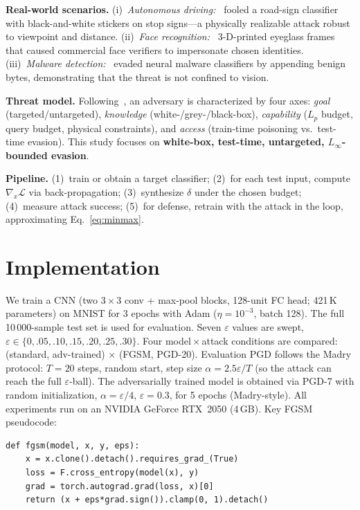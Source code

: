 \documentclass[10pt, twocolumn]{article}
\begin{document}
\textbf{Real-world scenarios.} (i)~\emph{Autonomous driving:}~\citet{eykholt2018robust} fooled a road-sign classifier with black-and-white stickers on stop signs---a physically realizable attack robust to viewpoint and distance. (ii)~\emph{Face recognition:}~\citet{sharif2016accessorize} 3-D-printed eyeglass frames that caused commercial face verifiers to impersonate chosen identities. (iii)~\emph{Malware detection:}~\citet{grosse2017adversarial} evaded neural malware classifiers by appending benign bytes, demonstrating that the threat is not confined to vision.

\textbf{Threat model.} Following~\citet{nist2021aml}, an adversary is characterized by four axes: \emph{goal} (targeted/untargeted), \emph{knowledge} (white-/grey-/black-box), \emph{capability} ($L_p$ budget, query budget, physical constraints), and \emph{access} (train-time poisoning vs.\ test-time evasion). This study focuses on \textbf{white-box, test-time, untargeted, $L_\infty$-bounded evasion}.

\textbf{Pipeline.} (1)~train or obtain a target classifier; (2)~for each test input, compute $\nabla_x\mathcal{L}$ via back-propagation; (3)~synthesize $\delta$ under the chosen budget; (4)~measure attack success; (5)~for defense, retrain with the attack in the loop, approximating Eq.~\eqref{eq:minmax}.

\section{Implementation}
\label{sec:impl}

We train a CNN (two $3{\times}3$ conv + max-pool blocks, 128-unit FC head; 421\,K parameters) on MNIST for 3 epochs with Adam ($\eta=10^{-3}$, batch 128). The full 10\,000-sample test set is used for evaluation. Seven $\varepsilon$ values are swept, $\varepsilon\in\{0,.05,.10,.15,.20,.25,.30\}$. Four model\,$\times$\,attack conditions are compared: (standard, adv-trained) $\times$ (FGSM, PGD-20). Evaluation PGD follows the Madry protocol: $T\!=\!20$ steps, random start, step size $\alpha\!=\!2.5\varepsilon/T$ (so the attack can reach the full $\varepsilon$-ball). The adversarially trained model is obtained via PGD-7 with random initialization, $\alpha\!=\!\varepsilon/4$, $\varepsilon\!=\!0.3$, for 5 epochs (Madry-style). All experiments run on an NVIDIA GeForce RTX~2050 (4\,GB). Key FGSM pseudocode:

\begin{lstlisting}
def fgsm(model, x, y, eps):
    x = x.clone().detach().requires_grad_(True)
    loss = F.cross_entropy(model(x), y)
    grad = torch.autograd.grad(loss, x)[0]
    return (x + eps*grad.sign()).clamp(0, 1).detach()
\end{lstlisting}
\end{document}
